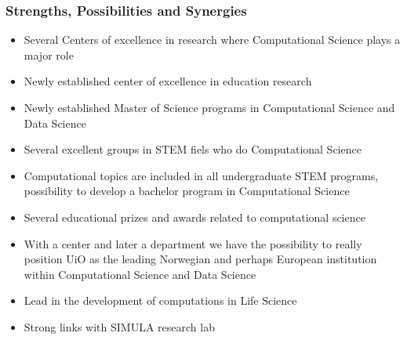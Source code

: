\documentclass{beamer}
\begin{document}
\begin{frame}
\frametitle{Strengths, Possibilities and Synergies}

\begin{itemize}
\item Several Centers of excellence in research where Computational Science plays a major role

\item Newly established center of excellence in education research

\item Newly established Master of Science programs in Computational Science and Data Science

\item Several excellent groups in STEM fiels who do Computational Science

\item Computational topics are included in all undergraduate STEM programs, possibility to develop a bachelor program in Computational Science

\item Several educational prizes and awards related to computational science 

\item With a center and later a department we have the possibility to really position UiO as the leading Norwegian and perhaps European institution within Computational Science and Data Science

\item Lead in the development of computations in Life Science

\item Strong links with SIMULA research lab
\end{itemize}

\noindent
\end{frame}
\end{document}
